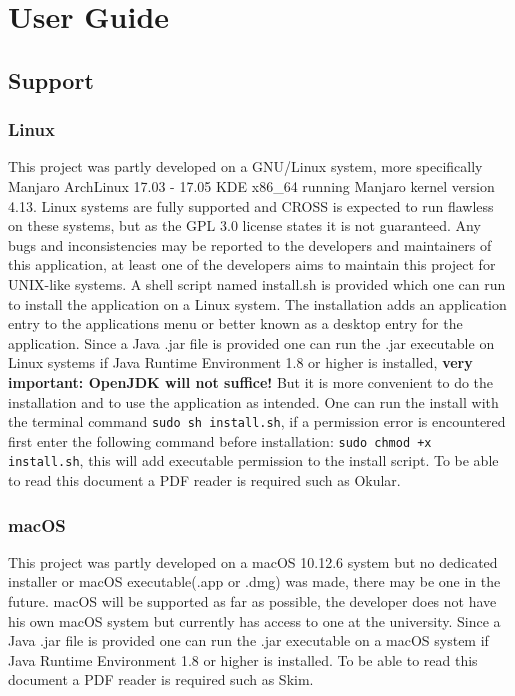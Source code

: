 \documentclass[11pt]{article}
\newcommand{\code}[1]{\texttt{#1}}
\begin{document}
	\section{User Guide}
		\subsection{Support}
			\subsubsection{Linux}
				This project was partly developed on a GNU/Linux system, more specifically Manjaro ArchLinux 17.03 - 17.05 KDE x86\_64 running Manjaro kernel version 4.13. Linux systems are fully supported and CROSS is expected to run flawless on these systems, but as the GPL 3.0 license states it is not guaranteed. Any bugs and inconsistencies may be reported to the developers and maintainers of this application, at least one of the developers aims to maintain this project for UNIX-like systems. A shell script named install.sh is provided which one can run to install the application on a Linux system. The installation adds an application entry to the applications menu or better known as a desktop entry for the application. Since a Java .jar file is provided one can run the .jar executable on Linux systems if Java Runtime Environment 1.8 or higher is installed, \textbf{very important: OpenJDK will not suffice!} But it is more convenient to do the installation and to use the application as intended. One can run the install with the terminal command \code{sudo sh install.sh}, if a permission error is encountered first enter the following command before installation: \code{sudo chmod +x install.sh}, this will add executable permission to the install script. To be able to read this document a PDF reader is required such as Okular.
				
			\subsubsection{macOS}
				This project was partly developed on a macOS 10.12.6 system but no dedicated installer or macOS executable(.app or .dmg) was made, there may be one in the future. macOS will be supported as far as possible, the developer does not have his own macOS system but currently has access to one at the university. Since a Java .jar file is provided one can run the .jar executable on a macOS system if Java Runtime Environment 1.8 or higher is installed. To be able to read this document a PDF reader is required such as Skim.
\end{document}
